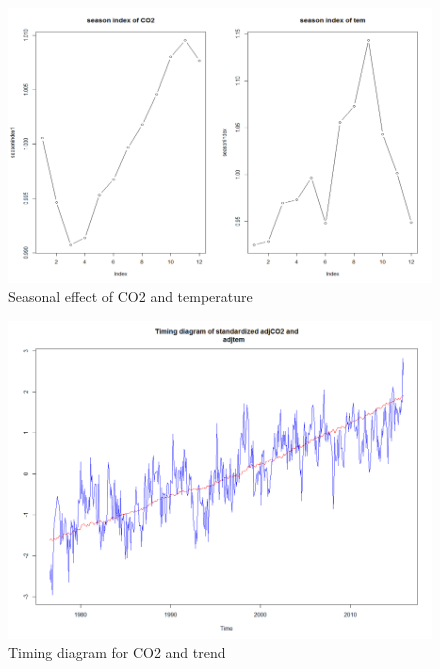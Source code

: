 \documentclass[a4paper,11pt]{article}
\begin{document}
\begin{figure}[H]
\centering
\caption{Seasonal effect of CO2 and temperature}
\includegraphics[scale=.80]{Picture3.png}
\end{figure}

\begin{figure}[H]
\centering
\caption{Timing diagram for CO2 and trend}
\includegraphics[scale=.80]{Picture4.png}
\end{figure}
\end{document}
